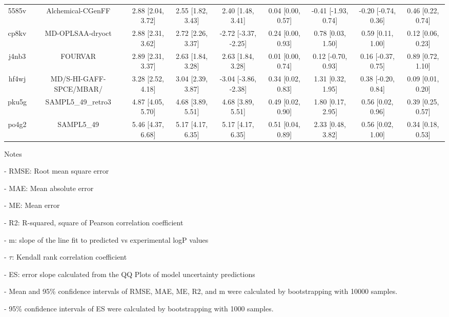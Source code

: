 \documentclass{article}
\begin{document}
\begin{center}
\begin{longtable}{|ccccccccc|}
 5585v &                                  Alchemical-CGenFF &  2.88 [2.04, 3.72] &  2.55 [1.82, 3.43] &     2.40 [1.48, 3.41] &  0.04 [0.00, 0.57] &  -0.41 [-1.93, 0.74] &  -0.20 [-0.74, 0.36] &     0.46 [0.22, 0.74] \\
 cp8kv &                                   MD-OPLSAA-dryoct &  2.88 [2.31, 3.62] &  2.72 [2.26, 3.37] &  -2.72 [-3.37, -2.25] &  0.24 [0.00, 0.93] &    0.78 [0.03, 1.50] &    0.59 [0.11, 1.00] &     0.12 [0.06, 0.23] \\
 j4nb3 &                                            FOURVAR &  2.89 [2.31, 3.37] &  2.63 [1.84, 3.28] &     2.63 [1.84, 3.28] &  0.01 [0.00, 0.74] &   0.12 [-0.70, 0.93] &   0.16 [-0.37, 0.75] &     0.89 [0.72, 1.10] \\
 hf4wj &                            MD/S-HI-GAFF-SPCE/MBAR/ &  3.28 [2.52, 4.18] &  3.04 [2.39, 3.87] &  -3.04 [-3.86, -2.38] &  0.34 [0.02, 0.83] &    1.31 [0.32, 1.95] &   0.38 [-0.20, 0.84] &     0.09 [0.01, 0.20] \\
 pku5g &                                 SAMPL5\_49\_retro3 &  4.87 [4.05, 5.70] &  4.68 [3.89, 5.51] &     4.68 [3.89, 5.51] &  0.49 [0.02, 0.90] &    1.80 [0.17, 2.95] &    0.56 [0.02, 0.96] &     0.39 [0.25, 0.57] \\
 po4g2 &                                         SAMPL5\_49 &  5.46 [4.37, 6.68] &  5.17 [4.17, 6.35] &     5.17 [4.17, 6.35] &  0.51 [0.04, 0.89] &    2.33 [0.48, 3.82] &    0.56 [0.02, 1.00] &     0.34 [0.18, 0.53] \\
\end{longtable}
\end{center}

Notes

- RMSE: Root mean square error

- MAE: Mean absolute error

- ME: Mean error

- R2: R-squared, square of Pearson correlation coefficient

- m: slope of the line fit to predicted vs experimental logP values

- $\tau$:  Kendall rank correlation coefficient

- ES: error slope calculated from the QQ Plots of model uncertainty predictions

- Mean and 95\% confidence intervals of RMSE, MAE, ME, R2, and m were calculated by bootstrapping with 10000 samples.

- 95\% confidence intervals of ES were calculated by bootstrapping with 1000 samples.\end{document}
\end{document}
